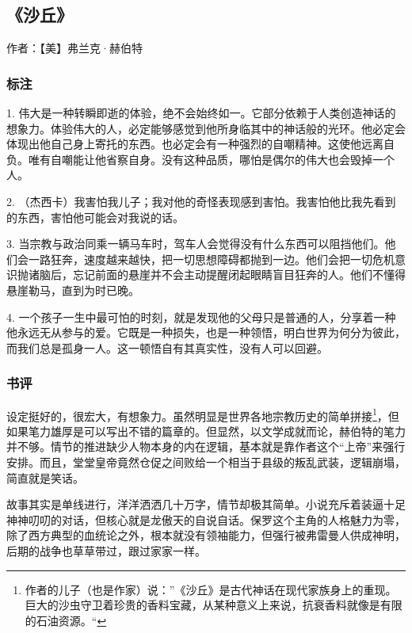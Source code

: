 \subsection{《沙丘》}

作者：【美】弗兰克·赫伯特

\subsubsection{标注}

1. 伟大是一种转瞬即逝的体验，绝不会始终如一。它部分依赖于人类创造神话的想象力。体验伟大的人，必定能够感觉到他所身临其中的神话般的光环。他必定会体现出他自己身上寄托的东西。也必定会有一种强烈的自嘲精神。这使他远离自负。唯有自嘲能让他省察自身。没有这种品质，哪怕是偶尔的伟大也会毁掉一个人。

2. （杰西卡）我害怕我儿子；我对他的奇怪表现感到害怕。我害怕他比我先看到的东西，害怕他可能会对我说的话。

3. 当宗教与政治同乘一辆马车时，驾车人会觉得没有什么东西可以阻挡他们。他们会一路狂奔，速度越来越快，把一切思想障碍都抛到一边。他们会把一切危机意识抛诸脑后，忘记前面的悬崖并不会主动提醒闭起眼睛盲目狂奔的人。他们不懂得悬崖勒马，直到为时已晚。

4. 一个孩子一生中最可怕的时刻，就是发现他的父母只是普通的人，分享着一种他永远无从参与的爱。它既是一种损失，也是一种领悟，明白世界为何分为彼此，而我们总是孤身一人。这一顿悟自有其真实性，没有人可以回避。

\subsubsection{书评}

设定挺好的，很宏大，有想象力。虽然明显是世界各地宗教历史的简单拼接\footnote{作者的儿子（也是作家）说：”《沙丘》是古代神话在现代家族身上的重现。巨大的沙虫守卫着珍贵的香料宝藏，从某种意义上来说，抗衰香料就像是有限的石油资源。“}，但如果笔力雄厚是可以写出不错的篇章的。但显然，以文学成就而论，赫伯特的笔力并不够。情节的推进缺少人物本身的内在逻辑，基本就是靠作者这个“上帝”来强行安排。而且，堂堂皇帝竟然仓促之间败给一个相当于县级的叛乱武装，逻辑崩塌，简直就是笑话。

故事其实是单线进行，洋洋洒洒几十万字，情节却极其简单。小说充斥着装逼十足神神叨叨的对话，但核心就是龙傲天的自说自话。保罗这个主角的人格魅力为零，除了西方典型的血统论之外，根本就没有领袖能力，但强行被弗雷曼人供成神明，后期的战争也草草带过，跟过家家一样。

